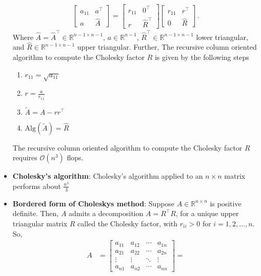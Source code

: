 \documentclass{report}
\begin{document}
\begin{itemize}
\begin{align*}
\begin{bmatrix}
                    a_{11} & a^{\top} \\
                    a & \hat{A}
                \end{bmatrix}
                =
                \begin{bmatrix}
                    r_{11} & 0^{\top} \\
                    r & \hat{R}^{\top}
                \end{bmatrix}
                \begin{bmatrix}
                    r_{11} & r^{\top} \\
                    0 & \hat{R}
                \end{bmatrix}
            .\end{align*}
            Where $\hat{A} = \hat{A}^{\top} \in \mathbb{R}^{n-1 \times n-1}$, $a \in \mathbb{R}^{n-1}$, $\hat{R}^{\top} \in \mathbb{R}^{n-1\times n-1}$ lower triangular, and $\hat{R} \in \mathbb{R}^{n-1\times n-1}$ upper triangular. Further,
            \bigbreak \noindent 
            The recursive column oriented algorithm to compute the Cholesky factor $R$ is given by the following steps
            \begin{enumerate}
                \item $r_{11} = \sqrt{a_{11}}$
                \item $r = \frac{a}{r_{11}} $
                \item $\tilde{A} = \hat{A} - rr^{\top} $
                \item $\text{Alg}(\tilde{A}) = \hat{R} $
            \end{enumerate}
            \bigbreak \noindent 
            The recursive column oriented algorithm to compute the Cholesky factor $R$ requires $\mathcal{O}(n^{3})$ flops.
        \item \textbf{Cholesky's algorithm}: Cholesky's algorithm  applied to an $n \times n$ matrix performs about $\frac{n^{3}}{3} $
        \item \textbf{Bordered form of Choleskys method}: Suppose $A \in \mathbb{R}^{n\times n}$ is positive definite. Then, $A$ admits a decomposition $A = R^{\top}R$, for a unique upper triangular matrix $R$ called the Cholesky factor, with $r_{ii} > 0$ for $i =1,2,...,n$. So,
            \begin{align*}
                        A &= \begin{bmatrix} a_{11} & a_{12} & \cdots & a_{1n} \\ a_{21} & a_{22} & \cdots & a_{2n} \\ \vdots & \vdots & \ddots & \vdots \\ a_{n1} & a_{n2} & \cdots & a_{nn} \end{bmatrix} = 

\end{align*}
\end{itemize}
\end{document}
